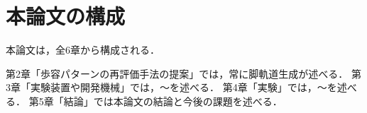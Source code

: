 \section{本論文の構成}
本論文は，全6章から構成される．

第2章「歩容パターンの再評価手法の提案」では，常に脚軌道生成が述べる．
第3章「実験装置や開発機械」では，～を述べる．
第4章「実験」では，～を述べる．
第5章「結論」では本論文の結論と今後の課題を述べる．







